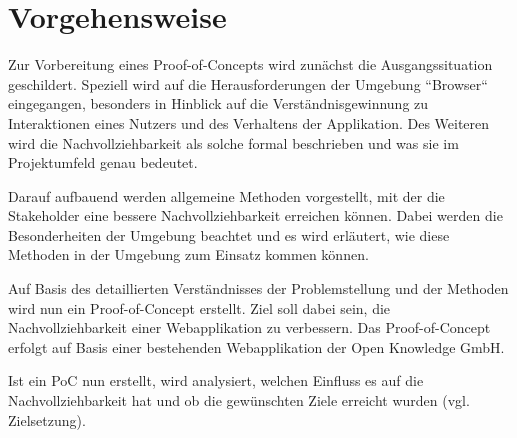 \pagebreak

\section{Vorgehensweise}

Zur Vorbereitung eines Proof-of-Concepts wird zunächst die Ausgangssituation geschildert. Speziell wird auf die Herausforderungen der Umgebung ``Browser`` eingegangen, besonders in Hinblick auf die Verständnisgewinnung zu Interaktionen eines Nutzers und des Verhaltens der Applikation. Des Weiteren wird die Nachvollziehbarkeit als solche formal beschrieben und was sie im Projektumfeld genau bedeutet.



Darauf aufbauend werden allgemeine Methoden vorgestellt, mit der die Stakeholder eine bessere Nachvollziehbarkeit erreichen können. Dabei werden die Besonderheiten der Umgebung beachtet und es wird erläutert, wie diese Methoden in der Umgebung zum Einsatz kommen können.


Auf Basis des detaillierten Verständnisses der Problemstellung und der Methoden wird nun ein Proof-of-Concept erstellt. Ziel soll dabei sein, die Nachvollziehbarkeit einer Webapplikation zu verbessern. Das Proof-of-Concept erfolgt auf Basis einer bestehenden Webapplikation der Open Knowledge GmbH. 

Ist ein PoC nun erstellt, wird analysiert, welchen Einfluss es auf die Nachvollziehbarkeit hat und ob die gewünschten Ziele erreicht wurden (vgl. Zielsetzung).

